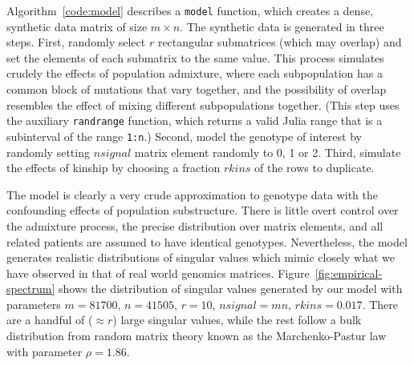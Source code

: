 \documentclass[review]{siamart0516}
\begin{document}
Algorithm~\ref{code:model} describes a \verb|model| function, which creates a
dense, synthetic data matrix of size $m\times n$. The synthetic data is
generated in three steps. First, randomly select $r$ rectangular submatrices
(which may overlap) and set the elements of each submatrix to the same value.
This process simulates crudely the effects of population admixture, where
each subpopulation has a common block of mutations that vary together, and the
possibility of overlap resembles the effect of mixing different subpopulations
together. (This step uses the auxiliary \verb|randrange| function, which returns
a valid Julia range that is a subinterval of the range \verb|1:n|.)
Second, model the genotype of interest by randomly setting $nsignal$ matrix
element randomly to 0, 1 or 2.
Third, simulate the effects of kinship by choosing a fraction $rkins$ of the
rows to duplicate.

The model is clearly a very crude approximation to genotype data with the
confounding effects of population substructure. There is little overt control
over the admixture process, the precise distribution over matrix elements, and
all related patients are assumed to have identical genotypes. Nevertheless, the
model generates realistic distributions of singular values which mimic closely
what we have observed in that of real world genomics matrices.
Figure~\ref{fig:empirical-spectrum} shows the distribution of singular values
generated by our model with parameters $m=81700$, $n=41505$, $r=10$,
$nsignal=mn$, $rkins=0.017$.
There are a handful of ($\approx r$) large singular values,
while the rest follow a bulk distribution from random matrix theory known as the
Marchenko-Pastur law~\cite{Marchenko1967} with parameter $\rho = 1.86$.
\end{document}
